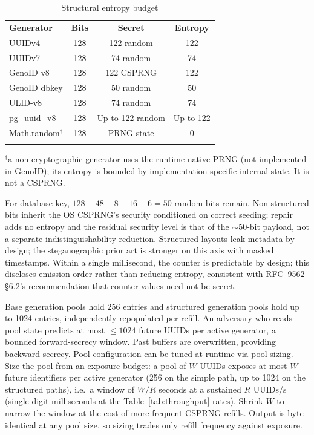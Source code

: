 \documentclass{svproc}
\begin{document}
\begin{table}[!ht]
\caption{Structural entropy budget}
\label{tab:min-entropy}
\centering
\footnotesize
\begin{tabular*}{\columnwidth}{@{\extracolsep{\fill}}lccc}

\hline\noalign{\smallskip}
\textbf{Generator} & \textbf{Bits} & \textbf{Secret} & \textbf{Entropy} \\
\noalign{\smallskip}\hline\noalign{\smallskip}
UUIDv4 & 128 & 122 random & 122 \\
UUIDv7 & 128 & 74 random & 74 \\
GenoID v8 & 128 & 122 CSPRNG & 122 \\
GenoID dbkey & 128 & 50 random & 50 \\
ULID-v8 & 128 & 74 random & 74 \\
pg\_uuid\_v8 & 128 & Up to 122 random & Up to 122 \\
Math.random$^\dagger$ & 128 & PRNG state & 0 \\
\noalign{\smallskip}\hline

\end{tabular*}
\smallskip
\footnotesize $^\dagger$a non-cryptographic generator uses the runtime-native PRNG (not implemented in GenoID); its entropy is bounded by implementation-specific internal state. It is not a CSPRNG.
\end{table}

For database-key, $128-48-8-16-6=50$ random bits remain. Non-structured bits inherit the OS CSPRNG's security conditioned on correct seeding; repair adds no entropy and the residual security level is that of the $\sim$50-bit payload, not a separate indistinguishability reduction. Structured layouts leak metadata by design; the steganographic prior art is stronger on this axis with masked timestamps. Within a single millisecond, the counter is predictable by design; this discloses emission order rather than reducing entropy, consistent with RFC~9562 \S6.2's recommendation that counter values need not be secret.

Base generation pools hold 256 entries and structured generation pools hold up to 1024 entries, independently repopulated per refill. An adversary who reads pool state predicts at most $\leq 1024$ future UUIDs per active generator, a bounded forward-secrecy window. Past buffers are overwritten, providing backward secrecy. Pool configuration can be tuned at runtime via pool sizing. Size the pool from an exposure budget: a pool of $W$ UUIDs exposes at most $W$ future identifiers per active generator (256 on the simple path, up to 1024 on the structured paths), i.e.\ a window of $W/R$ seconds at a sustained $R$ UUIDs/s (single-digit milliseconds at the Table~\ref{tab:throughput} rates). Shrink $W$ to narrow the window at the cost of more frequent CSPRNG refills. Output is byte-identical at any pool size, so sizing trades only refill frequency against exposure.
\end{document}
